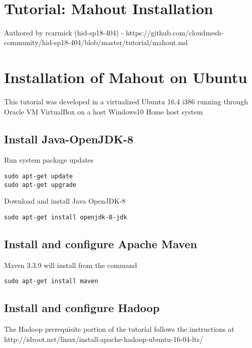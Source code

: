 \MDNAME\

\section{Tutorial: Mahout Installation}

Authored by rcarmick (hid-sp18-404) -
https://github.com/cloudmesh-community/hid-sp18-404/blob/master/tutorial/mahout.md

\section{Installation of Mahout on Ubuntu}

This tutorial was developed in a virtualized Ubuntu 16.4 i386 running
through Oracle VM VirtualBox on a host Windows10 Home host system

\subsection{Install Java-OpenJDK-8}

Run system package updates

\begin{lstlisting}
sudo apt-get update
sudo apt-get upgrade
\end{lstlisting}

Download and install Java OpenJDK-8

\begin{lstlisting}
sudo apt-get install openjdk-8-jdk
\end{lstlisting}

\subsection{Install and configure Apache Maven}

Maven 3.3.9 will install from the command

\begin{lstlisting}
sudo apt-get install maven
\end{lstlisting}

\subsection{Install and configure Hadoop}

The Hadoop prerequisite portion of the tutorial follows the instructions
at http://idroot.net/linux/install-apache-hadoop-ubuntu-16-04-lts/

